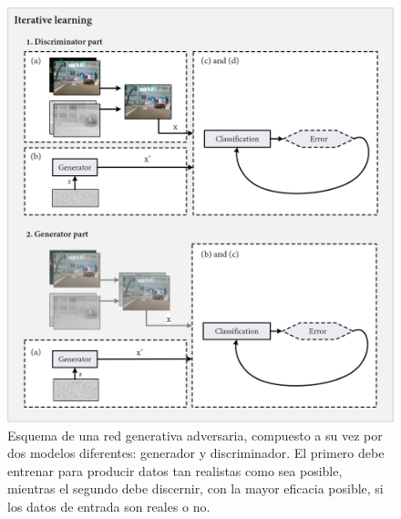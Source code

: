 \begin{figure}
    \centering
    \includegraphics[width=\linewidth]{figs/conclusions/gan.png}
    \caption{Esquema de una red generativa adversaria, compuesto a su vez por dos modelos diferentes: generador y discriminador. El primero debe entrenar para producir datos tan realistas como sea posible, mientras el segundo debe discernir, con la mayor eficacia posible, si los datos de entrada son reales o no.}
    \label{fig:conclusiones_gan}
\end{figure}